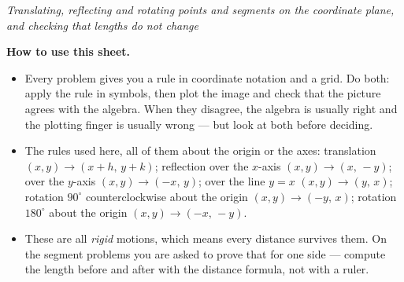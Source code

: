 \documentclass[12pt]{article}
\begin{document}

\begin{center}\small\textit{Translating, reflecting and rotating points and segments on the
coordinate plane, and checking that lengths do not change}\end{center}

\noindent\small\textbf{How to use this sheet.}
\begin{itemize}[label={$\bullet$}, leftmargin=1.1cm, itemsep=1pt, topsep=2pt]
  \item Every problem gives you a rule in coordinate notation and a grid. Do both: apply
        the rule in symbols, then plot the image and check that the picture agrees with
        the algebra. When they disagree, the algebra is usually right and the plotting
        finger is usually wrong --- but look at both before deciding.
  \item The rules used here, all of them about the origin or the axes:
        translation $(x, y) \rightarrow (x + h,\, y + k)$;
        reflection over the $x$-axis $(x, y) \rightarrow (x,\, -y)$;
        over the $y$-axis $(x, y) \rightarrow (-x,\, y)$;
        over the line $y = x$ $(x, y) \rightarrow (y,\, x)$;
        rotation $90^\circ$ counterclockwise about the origin
        $(x, y) \rightarrow (-y,\, x)$;
        rotation $180^\circ$ about the origin $(x, y) \rightarrow (-x,\, -y)$.
  \item These are all \emph{rigid} motions, which means every distance survives them. On
        the segment problems you are asked to prove that for one side --- compute the
        length before and after with the distance formula, not with a ruler.
\end{itemize}
\normalsize

\bigskip
\end{document}

